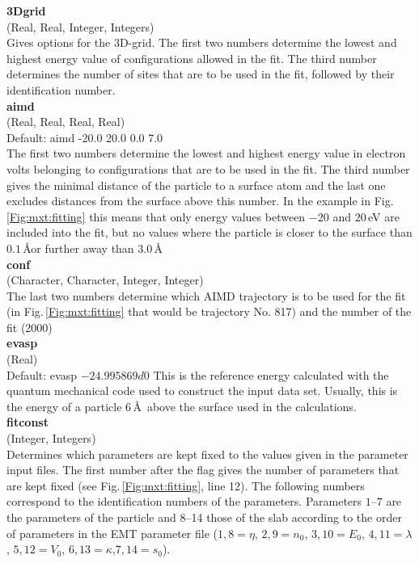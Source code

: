 \documentclass[twoside, 11pt, titlepage, captions=nooneline, a4paper, headsepline]{scrbook}%
\newcommand{\9}{\mathrm}
\newcommand{\0}{\,\mathrm}
\begin{document}
\noindent\textbf{3Dgrid}\\
(Real, Real, Integer, Integers)\\
Gives options for the 3D-grid. The first two numbers determine the lowest and highest energy value of configurations allowed in the fit. The third number determines the number of sites that are to be used in the fit, followed by their identification number.\\

\noindent\textbf{aimd}\\
(Real, Real, Real, Real)\\ 
Default: aimd -20.0 20.0 0.0 7.0\\
The first two numbers determine the lowest and highest energy value in electron volts belonging to configurations that are to be used in the fit. The third number gives the minimal distance of the particle to a surface atom and the last one excludes distances from the surface above this number. In the example in Fig.\,\ref{Fig:mxt:fitting} this means that only energy values between $-20$ and $20$\,eV are included into the fit, but no values where the particle is closer to the surface than $0.1$\,\AA or further away than $3.0$\,\AA\\

\noindent\textbf{conf}\\
(Character, Character, Integer, Integer)\\ 
The last two numbers determine which AIMD trajectory is to be used for the fit (in Fig.\,\ref{Fig:mxt:fitting} that would be trajectory No. 817) and the number of the fit (2000)\\

\noindent\textbf{evasp}\\
(Real)\\ 
Default: evasp $-24.995869d0$
This is the reference energy calculated with the quantum mechanical code used to construct the input data set. Usually, this is the energy of a particle 6\,\AA~above the surface used in the calculations.\\

\noindent\textbf{fitconst}\\
(Integer, Integers)\\
Determines which parameters are kept fixed to the values given in the parameter input files. The first number after the flag gives the number of parameters that are kept fixed (see Fig.\,\ref{Fig:mxt:fitting}, line 12). The following numbers correspond to the identification numbers of the parameters. Parameters $1$--$7$ are the parameters of the particle and 8--14 those of the slab according to the order of parameters in the EMT parameter file ($1,8 = \eta$, $2,9 = n_0$, $3,10 = E_0$, $4,11 = \lambda$, $5,12 = V_0$, $6,13 = \kappa$,$7,14 = s_0$).\\
\end{document}
